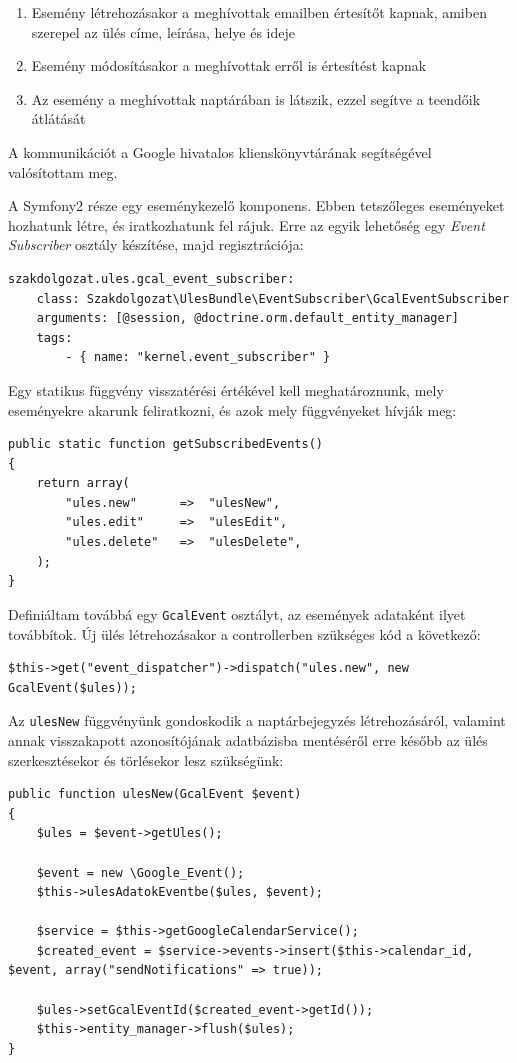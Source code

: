 \documentclass[a4paper,12pt,oneside]{report}
\begin{document}
\begin{enumerate}
    \item Esemény létrehozásakor a meghívottak emailben értesítőt kapnak, amiben szerepel az ülés címe, leírása, helye és ideje
    \item Esemény módosításakor a meghívottak erről is értesítést kapnak
    \item Az esemény a meghívottak naptárában is látszik, ezzel segítve a teendőik átlátását
\end{enumerate}

A kommunikációt a Google hivatalos klienskönyvtárának segítségével valósítottam meg.

A Symfony2 része egy eseménykezelő komponens. Ebben tetszőleges eseményeket hozhatunk létre, és iratkozhatunk fel rájuk. Erre az egyik lehetőség egy {\it Event Subscriber} osztály készítése, majd regisztrációja:

\begin{lstlisting}
szakdolgozat.ules.gcal_event_subscriber:
    class: Szakdolgozat\UlesBundle\EventSubscriber\GcalEventSubscriber
    arguments: [@session, @doctrine.orm.default_entity_manager]
    tags:
        - { name: "kernel.event_subscriber" }
\end{lstlisting}

Egy statikus függvény visszatérési értékével kell meghatároznunk, mely eseményekre akarunk feliratkozni, és azok mely függvényeket hívják meg:

\begin{lstlisting}
public static function getSubscribedEvents()
{
    return array(
        "ules.new"      =>  "ulesNew",
        "ules.edit"     =>  "ulesEdit",
        "ules.delete"   =>  "ulesDelete",
    );
}
\end{lstlisting}

Definiáltam továbbá egy {\tt GcalEvent} osztályt, az események adataként ilyet továbbítok. Új ülés létrehozásakor a controllerben szükséges kód a következő:

\begin{lstlisting}
$this->get("event_dispatcher")->dispatch("ules.new", new GcalEvent($ules));
\end{lstlisting}

Az {\tt ulesNew} függvényünk gondoskodik a naptárbejegyzés létrehozásáról, valamint annak visszakapott azonosítójának adatbázisba mentéséről \textendash{} erre később az ülés szerkesztésekor és törlésekor lesz szükségünk:

\begin{lstlisting}
public function ulesNew(GcalEvent $event)
{
    $ules = $event->getUles();

    $event = new \Google_Event();
    $this->ulesAdatokEventbe($ules, $event);

    $service = $this->getGoogleCalendarService();
    $created_event = $service->events->insert($this->calendar_id, $event, array("sendNotifications" => true));

    $ules->setGcalEventId($created_event->getId());
    $this->entity_manager->flush($ules);
}
\end{lstlisting}
\end{document}
